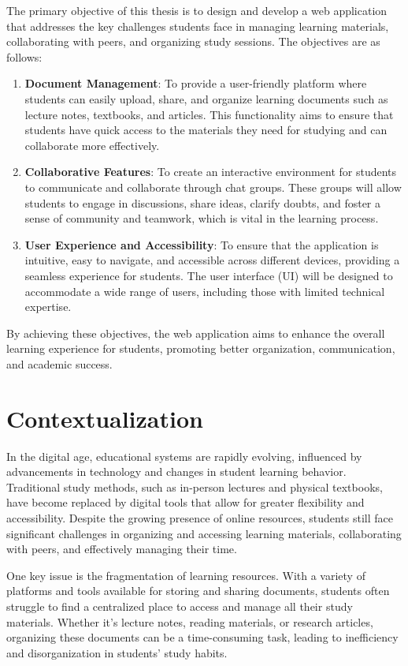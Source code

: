 The primary objective of this thesis is to design and develop a web application that addresses the key challenges students face in managing learning materials, collaborating with peers, and organizing study sessions. The objectives are as follows:

\begin{enumerate}
    \item \textbf{Document Management}: To provide a user-friendly platform where students can easily upload, share, and organize learning documents such as lecture notes, textbooks, and articles. This functionality aims to ensure that students have quick access to the materials they need for studying and can collaborate more effectively.
    \item \textbf{Collaborative Features}: To create an interactive environment for students to communicate and collaborate through chat groups. These groups will allow students to engage in discussions, share ideas, clarify doubts, and foster a sense of community and teamwork, which is vital in the learning process.
    \item \textbf{User Experience and Accessibility}: To ensure that the application is intuitive, easy to navigate, and accessible across different devices, providing a seamless experience for students. The user interface (UI) will be designed to accommodate a wide range of users, including those with limited technical expertise.
\end{enumerate}

By achieving these objectives, the web application aims to enhance the overall learning experience for students, promoting better organization, communication, and academic success.

\section{Contextualization}

In the digital age, educational systems are rapidly evolving, influenced by advancements in technology and changes in student learning behavior. Traditional study methods, such as in-person lectures and physical textbooks, have become replaced by digital tools that allow for greater flexibility and accessibility. Despite the growing presence of online resources, students still face significant challenges in organizing and accessing learning materials, collaborating with peers, and effectively managing their time.

One key issue is the fragmentation of learning resources. With a variety of platforms and tools available for storing and sharing documents, students often struggle to find a centralized place to access and manage all their study materials. Whether it's lecture notes, reading materials, or research articles, organizing these documents can be a time-consuming task, leading to inefficiency and disorganization in students' study habits.

